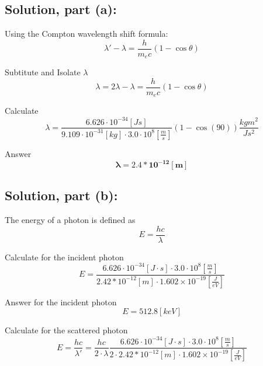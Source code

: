 \documentclass[12pt]{article}
\begin{document}
    \subsection*{Solution, part (a):}

        Using the Compton wavelength shift formula:
        \begin{equation}
            \lambda' - \lambda = \frac{h}{m_e c} (1 - \cos \theta)
        \end{equation}

        Subtitute and Isolate $\lambda$
        \begin{equation}
            \lambda = 2\lambda - \lambda = \frac{h}{m_e c} (1 - \cos \theta)
        \end{equation}

        Calculate
        \begin{equation}
            \lambda = \frac{6.626 \cdot 10^{-34} [Js]}{9.109 \cdot 10^{-31} [kg] \cdot 3.0 \cdot 10^8 [\frac{m}{s}]} (1 - \cos(90)) \frac{kg m^2}{Js^2}
        \end{equation}

        Answer
        \begin{equation}
            \boxed{\boldsymbol{\lambda = 2.4*10^{-12} [m]}}
        \end{equation}

        \subsection*{Solution, part (b):}

        The energy of a photon is defined as
        \begin{equation}
            E = \frac{hc}{\lambda}
        \end{equation}

        Calculate for the incident photon
        \begin{equation}
            E = \frac{6.626 \cdot 10^{-34} [J \cdot s] \cdot 3.0 \cdot 10^8 [\frac{m}{s}]}{2.42*10^{-12} [m] \cdot 1.602 \times 10^{-19} [\frac{J}{eV}]}
        \end{equation}

        Answer for the incident photon
        \begin{equation}
            E = 512.8 [keV]
        \end{equation}

        Calculate for the scattered photon
        \begin{equation}
            E = \frac{hc}{\lambda'} = \frac{hc}{2 \cdot \lambda}\frac{6.626 \cdot 10^{-34} [J \cdot s] \cdot 3.0 \cdot 10^8 [\frac{m}{s}]}{2 \cdot 2.42*10^{-12} [m] \cdot 1.602 \times 10^{-19} [\frac{J}{eV}]}
        \end{equation}
\end{document}
